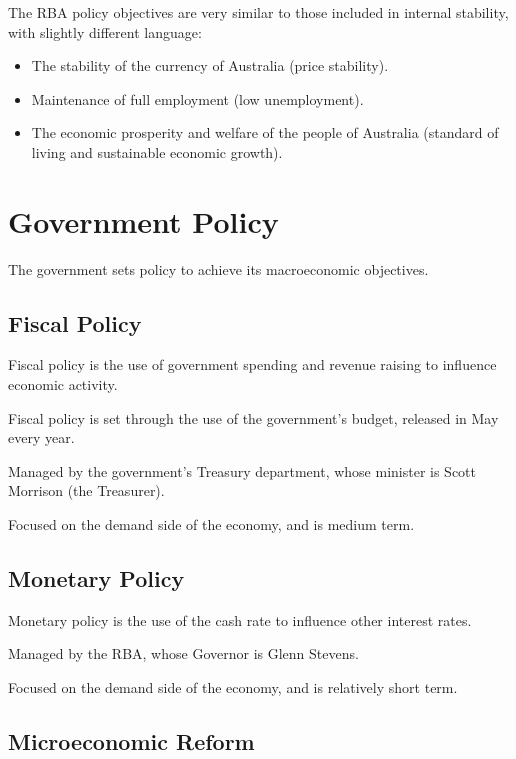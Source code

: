 \documentclass[a4paper,11pt]{article}
\begin{document}
The RBA policy objectives are very similar to those included in internal
stability, with slightly different language:

\begin{itemize}
\item The stability of the currency of Australia (price stability).
\item Maintenance of full employment (low unemployment).
\item The economic prosperity and welfare of the people of Australia (standard
	of living and sustainable economic growth).
\end{itemize}




\section{Government Policy}

The government sets policy to achieve its macroeconomic objectives.


\subsection{Fiscal Policy}

Fiscal policy is the use of government spending and revenue raising to influence
economic activity.

Fiscal policy is set through the use of the government's budget, released in May
every year.

Managed by the government's Treasury department, whose minister is Scott
Morrison (the Treasurer).

Focused on the demand side of the economy, and is medium term.


\subsection{Monetary Policy}

Monetary policy is the use of the cash rate to influence other interest rates.

Managed by the RBA, whose Governor is Glenn Stevens.

Focused on the demand side of the economy, and is relatively short term.


\subsection{Microeconomic Reform}
\end{document}
